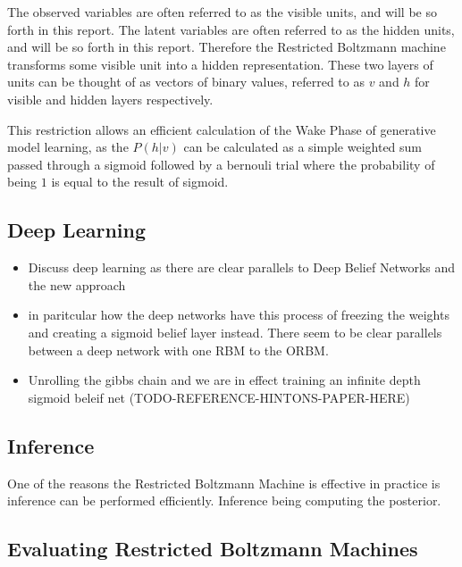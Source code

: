 The observed variables are often referred to as the visible units, and will be so forth in this report. The latent variables are often referred to as the hidden units, and will be so forth in this report. Therefore the Restricted Boltzmann machine transforms some visible unit into a hidden representation. These two layers of units can be thought of as vectors of binary values, referred to as $ v $ and $ h $ for visible and hidden layers respectively.

This restriction allows an efficient calculation of the Wake Phase of generative model learning, as the $ P(h|v) $ can be calculated as a simple weighted sum passed through a sigmoid followed by a bernouli trial where the probability of being $1$ is equal to the result of sigmoid.



\subsection{Deep Learning}

  \begin{itemize}
    \item Discuss deep learning as there are clear parallels to Deep Belief Networks and the new approach
    \item in paritcular how the deep networks have this process of freezing the weights and creating a sigmoid belief layer instead. There seem to be clear parallels between a deep network with one RBM to the ORBM.
  \end{itemize}

\begin{itemize}
  \item Unrolling the gibbs chain and we are in effect training an infinite depth sigmoid beleif net (TODO-REFERENCE-HINTONS-PAPER-HERE)
\end{itemize}

  \subsection{Inference}
  One of the reasons the Restricted Boltzmann Machine is effective in practice is inference can be performed efficiently. Inference being computing the posterior.

  \subsection{Evaluating Restricted Boltzmann Machines}

